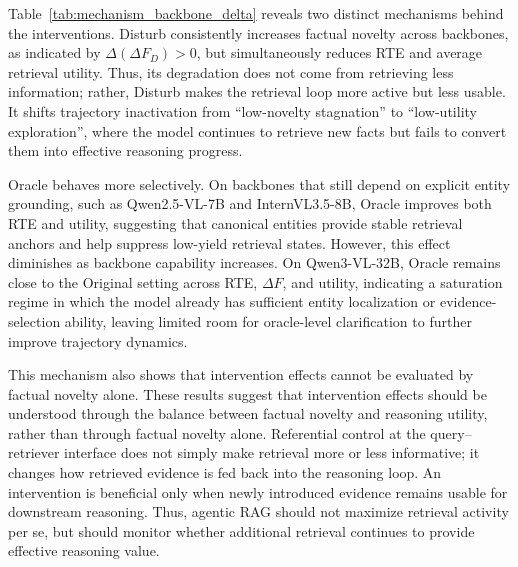 \documentclass{article} %
\begin{document}
Table~\ref{tab:mechanism_backbone_delta} reveals two distinct mechanisms behind the interventions. Disturb consistently increases factual novelty across backbones, as indicated by $\Delta(\Delta F_D)>0$, but simultaneously reduces RTE and average retrieval utility. Thus, its degradation does not come from retrieving less information; rather, Disturb makes the retrieval loop more active but less usable. It shifts trajectory inactivation from ``low-novelty stagnation'' to ``low-utility exploration'', where the model continues to retrieve new facts but fails to convert them into effective reasoning progress.

Oracle behaves more selectively. On backbones that still depend on explicit entity grounding, such as Qwen2.5-VL-7B and InternVL3.5-8B, Oracle improves both RTE and utility, suggesting that canonical entities provide stable retrieval anchors and help suppress low-yield retrieval states. However, this effect diminishes as backbone capability increases. On Qwen3-VL-32B, Oracle remains close to the Original setting across RTE, $\Delta F$, and utility, indicating a saturation regime in which the model already has sufficient entity localization or evidence-selection ability, leaving limited room for oracle-level clarification to further improve trajectory dynamics.

This mechanism also shows that intervention effects cannot be evaluated by factual novelty alone. These results suggest that intervention effects should be understood through the balance between factual novelty and reasoning utility, rather than through factual novelty alone. Referential control at the query--retriever interface does not simply make retrieval more or less informative; it changes how retrieved evidence is fed back into the reasoning loop. An intervention is beneficial only when newly introduced evidence remains usable for downstream reasoning. Thus, agentic RAG should not maximize retrieval activity per se, but should monitor whether additional retrieval continues to provide effective reasoning value.
\end{document}
